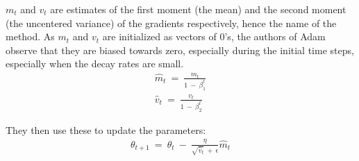 $m_t$ and $v_t$ are estimates of the first moment (the mean) and the second moment (the uncentered variance) of the gradients respectively, hence the name of the method. As $m_t$ and $v_t$ are initialized as vectors of 0's, the authors of Adam observe that they are biased towards zero, especially during the initial time steps, especially when the decay rates are small.
\begin{align}
    \hat{m}_t \: = \: \frac{m_t}{1\:-\:\beta^t_1} \\
 \hat{v}_t \: = \: \frac{v_t}{1\: - \: \beta^t_2}
\end{align}



They then use these to update the parameters:
\begin{align}
\theta_{t+1} \: = \: \theta_t \: - \: \frac{\eta}{\sqrt{\hat{v}_t} \: +\: \epsilon} \hat{m}_t 
\end{align}
